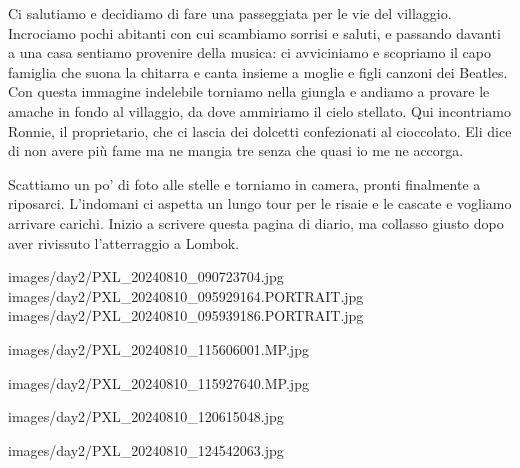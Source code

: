 Ci salutiamo e decidiamo di fare una passeggiata per le vie del villaggio. Incrociamo pochi abitanti con cui scambiamo sorrisi e saluti, e passando davanti a una casa sentiamo provenire della musica: ci avviciniamo e scopriamo il capo famiglia che suona la chitarra e canta insieme a moglie e figli canzoni dei Beatles. Con questa immagine indelebile torniamo nella giungla e andiamo a provare le amache in fondo al villaggio, da dove ammiriamo il cielo stellato. Qui incontriamo Ronnie, il proprietario, che ci lascia dei dolcetti confezionati al cioccolato. Eli dice di non avere più fame ma ne mangia tre senza che quasi io me ne accorga.

Scattiamo un po' di foto alle stelle e torniamo in camera, pronti finalmente a riposarci. L'indomani ci aspetta un lungo tour per le risaie e le cascate e vogliamo arrivare carichi. Inizio a scrivere questa pagina di diario, ma collasso giusto dopo aver rivissuto l'atterraggio a Lombok.

\pagestyle{empty} %

%

                      {images/day2/PXL_20240810_090723704.jpg}
                        {images/day2/PXL_20240810_095929164.PORTRAIT.jpg}
                        {images/day2/PXL_20240810_095939186.PORTRAIT.jpg} 
%


                      {images/day2/PXL_20240810_115606001.MP.jpg}
%


                      {images/day2/PXL_20240810_115927640.MP.jpg}
%

                      {images/day2/PXL_20240810_120615048.jpg}
                      
                      {images/day2/PXL_20240810_124542063.jpg} 
%

%

%
%

\pagestyle{fancy} %